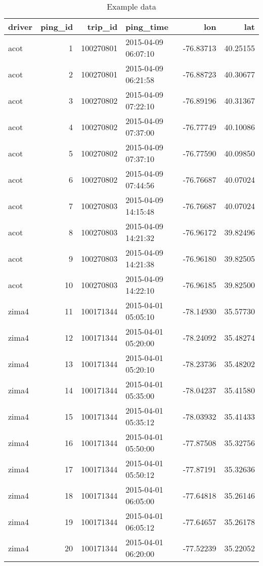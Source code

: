 \documentclass[]{article}
\newenvironment{Shaded}{\begin{snugshade}}{\end{snugshade}}
\newcommand{\DataTypeTok}[1]{\textcolor[rgb]{0.13,0.29,0.53}{#1}}
\newcommand{\KeywordTok}[1]{\textcolor[rgb]{0.13,0.29,0.53}{\textbf{#1}}}
\newcommand{\NormalTok}[1]{#1}
\newcommand{\OperatorTok}[1]{\textcolor[rgb]{0.81,0.36,0.00}{\textbf{#1}}}
\newcommand{\OtherTok}[1]{\textcolor[rgb]{0.56,0.35,0.01}{#1}}
\newcommand{\StringTok}[1]{\textcolor[rgb]{0.31,0.60,0.02}{#1}}
\begin{document}
\begin{Shaded}
\end{Shaded}

\begin{table}[!h]

\caption{\label{tab:unnamed-chunk-2}Example data}
\centering
\begin{tabular}{lrrlrr}
\toprule
driver & ping\_id & trip\_id & ping\_time & lon & lat\\
\midrule
acot & 1 & 100270801 & 2015-04-09 06:07:10 & -76.83713 & 40.25155\\
acot & 2 & 100270801 & 2015-04-09 06:21:58 & -76.88723 & 40.30677\\
acot & 3 & 100270802 & 2015-04-09 07:22:10 & -76.89196 & 40.31367\\
acot & 4 & 100270802 & 2015-04-09 07:37:00 & -76.77749 & 40.10086\\
acot & 5 & 100270802 & 2015-04-09 07:37:10 & -76.77590 & 40.09850\\
\addlinespace
acot & 6 & 100270802 & 2015-04-09 07:44:56 & -76.76687 & 40.07024\\
acot & 7 & 100270803 & 2015-04-09 14:15:48 & -76.76687 & 40.07024\\
acot & 8 & 100270803 & 2015-04-09 14:21:32 & -76.96172 & 39.82496\\
acot & 9 & 100270803 & 2015-04-09 14:21:38 & -76.96180 & 39.82505\\
acot & 10 & 100270803 & 2015-04-09 14:22:10 & -76.96185 & 39.82500\\
\addlinespace
zima4 & 11 & 100171344 & 2015-04-01 05:05:10 & -78.14930 & 35.57730\\
zima4 & 12 & 100171344 & 2015-04-01 05:20:00 & -78.24092 & 35.48274\\
zima4 & 13 & 100171344 & 2015-04-01 05:20:10 & -78.23736 & 35.48202\\
zima4 & 14 & 100171344 & 2015-04-01 05:35:00 & -78.04237 & 35.41580\\
zima4 & 15 & 100171344 & 2015-04-01 05:35:12 & -78.03932 & 35.41433\\
\addlinespace
zima4 & 16 & 100171344 & 2015-04-01 05:50:00 & -77.87508 & 35.32756\\
zima4 & 17 & 100171344 & 2015-04-01 05:50:12 & -77.87191 & 35.32636\\
zima4 & 18 & 100171344 & 2015-04-01 06:05:00 & -77.64818 & 35.26146\\
zima4 & 19 & 100171344 & 2015-04-01 06:05:12 & -77.64657 & 35.26178\\
zima4 & 20 & 100171344 & 2015-04-01 06:20:00 & -77.52239 & 35.22052\\
\bottomrule
\end{tabular}
\end{table}
\end{document}
